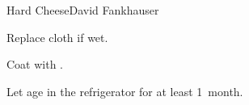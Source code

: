 \begin{recipe}{Hard Cheese}{David Fankhauser}{}
\begin{directions}
\item Replace cloth if wet.
\end{directions}

\begin{directions}
\item Coat with .
\item Let age in the refrigerator for at least 1~month.
\end{directions}

\end{recipe}
